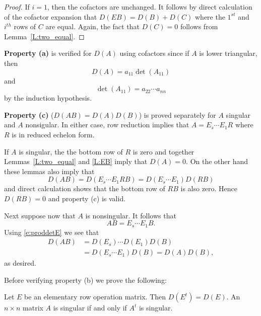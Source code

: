 \documentclass{ximera}
\begin{document}
\begin{proof}
If $i=1$, then the cofactors are unchanged.  It follows by direct calculation of the 
cofactor expansion that $D(EB) = D(B) + D(C)$ where the $1^{st}$ and $i^{th}$ 
rows of $C$ are equal.  Again, the fact that $D(C)=0$ follows from 
Lemma~\ref{L:two_equal}.
\end{proof}

{\bf Property (a)} is verified for $D(A)$ using cofactors since if $A$ is lower
triangular, then
\[
D(A) = a_{11}\det(A_{11}) 
\]
and 
\[
\det(A_{11}) = a_{22}\cdots a_{nn}
\]
by the induction hypothesis.

{\bf Property (c)} ($D(AB)=D(A)D(B)$) is proved separately 
for $A$ singular and $A$ nonsigular.  In either case, row 
reduction implies that $A = E_s\cdots E_1 R$ where $R$ is 
in reduced echelon form. 

If $A$ is singular, the the bottom row of $R$ is zero and together 
Lemmas~\ref{L:two_equal} and \ref{L:EB} imply that $D(A)=0$.
On the other hand these lemmas also imply that 
\[
D(AB) = D(E_s\cdots E_1 RB)  = D(E_s\cdots E_1) D(RB) 
\]
and direct calculation shows that the bottom row of $RB$ is 
also zero.  Hence $D(RB)=0$ and property (c) is valid.

Next suppose now that $A$ is nonsingular.  It follows that 
\[
AB = E_s\cdots E_1B.
\]
Using \eqref{e:proddetE} we see that
\begin{align*}
D(AB) &=  D(E_s)\cdots D(E_1)D(B) \\
&= D(E_s\cdots E_1)D(B) = D(A)D(B),
\end{align*}
as desired.  

Before verifying property (b) we prove the following:
\begin{lemma}
Let $E$ be an elementary row operation matrix.  Then $D(E^t) = D(E)$.   
An $n\times n$ matrix $A$ is singular if and only if $A^t$ is singular.
\end{lemma}
\end{document}
